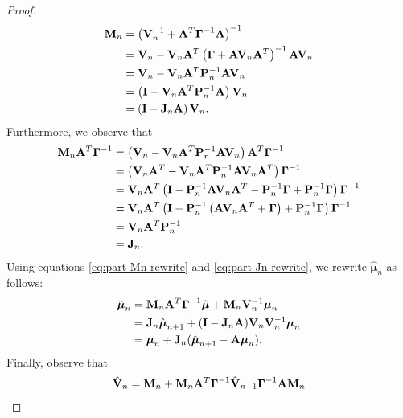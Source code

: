 \documentclass[12pt, oneside]{book}
\numberwithin{equation}{section}
\begin{document}
{\begin{proof}
	\begin{align}
		{\bf M}_n 
			&= \left({\bf V}_n^{-1} + {\bf A}^T \boldsymbol\Gamma^{-1} {\bf A}\right)^{-1}\\
			&= {\bf V}_n - {\bf V}_n{\bf A}^T\left(\boldsymbol\Gamma + {\bf A}{\bf V}_n {\bf A}^T\right)^{-1}{\bf A}{\bf V}_n\\
			&= {\bf V}_n - {\bf V}_n{\bf A}^T{\bf P}_n^{-1}{\bf A}{\bf V}_n\\
			&= \left({\bf I} - {\bf V}_n{\bf A}^T{\bf P}_n^{-1}{\bf A}\right){\bf V}_n\\
			&= \left({\bf I} - {\bf J}_n{\bf A}\right){\bf V}_n. \label{eq:part-Mn-rewrite}
	\end{align}
	Furthermore, we observe that
	\begin{align}
		{\bf M}_n {\bf A}^T \boldsymbol{\Gamma}^{-1}
		&= \left({\bf V}_n - {\bf V}_n{\bf A}^T{\bf P}_n^{-1}{\bf A}{\bf V}_n\right){\bf A}^T\boldsymbol\Gamma^{-1}\\
		&= \left({\bf V}_n{\bf A}^T - {\bf V}_n{\bf A}^T{\bf P}_n^{-1}{\bf A}{\bf V}_n{\bf A}^T\right)\boldsymbol\Gamma^{-1}\\
		&= {\bf V}_n{\bf A}^T\left({\bf I} - {\bf P}_n^{-1}{\bf A}{\bf V}_n{\bf A}^T - {\bf P}_n^{-1}\boldsymbol{\Gamma} + {\bf P}_n^{-1}\boldsymbol{\Gamma}\right)\boldsymbol\Gamma^{-1}\\
		&= {\bf V}_n{\bf A}^T\left({\bf I} - {\bf P}_n^{-1}\left({\bf A}{\bf V}_n{\bf A}^T + \boldsymbol\Gamma\right) + {\bf P}_n^{-1}\boldsymbol{\Gamma}\right)\boldsymbol\Gamma^{-1}\\
		&= {\bf V}_n{\bf A}^T {\bf P}_n^{-1}\\
		&= {\bf J}_n. \label{eq:part-Jn-rewrite}
	\end{align}
	Using equations \eqref{eq:part-Mn-rewrite} and \eqref{eq:part-Jn-rewrite}, we rewrite $\hat{\boldsymbol{\mu}}_n$ as follows:
	\begin{align}
		\hat{\boldsymbol{\mu}}_n 
		&= {\bf M}_n {\bf A}^T \boldsymbol\Gamma ^{-1} \hat{\boldsymbol{\mu}} + {\bf M}_n {\bf V}_n^{-1} \boldsymbol\mu_n\\
		&= {\bf J}_n \hat{\boldsymbol{\mu}}_{n+1} + ({\bf I} - {\bf J}_n {\bf A}){\bf V}_n{\bf V}_n^{-1}\boldsymbol{\mu}_n\\
		&= \boldsymbol{\mu}_n + {\bf J}_n(\hat{\boldsymbol{\mu}}_{n+1} - {\bf A}\boldsymbol\mu_n).
	\end{align}
	Finally, observe that 
	\begin{align}
		\hat{{\bf V}}_n
		&= {\bf M}_n + {\bf M}_n {\bf A}^T \boldsymbol{\Gamma}^{-1} \hat{\bf V}_{n+1}\boldsymbol\Gamma^{-1}{\bf A}{\bf M}_n\\

\end{align}
\end{proof}}
\end{document}
